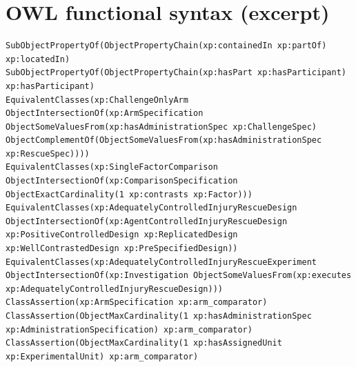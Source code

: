 \documentclass[10pt,a4paper]{article}
\begin{document}
\section{OWL functional syntax (excerpt)}\label{app:ofn}
\begin{Verbatim}[fontsize=\tiny,breaklines,frame=lines,framesep=2mm]
SubObjectPropertyOf(ObjectPropertyChain(xp:containedIn xp:partOf) xp:locatedIn)
SubObjectPropertyOf(ObjectPropertyChain(xp:hasPart xp:hasParticipant) xp:hasParticipant)
EquivalentClasses(xp:ChallengeOnlyArm ObjectIntersectionOf(xp:ArmSpecification ObjectSomeValuesFrom(xp:hasAdministrationSpec xp:ChallengeSpec) ObjectComplementOf(ObjectSomeValuesFrom(xp:hasAdministrationSpec xp:RescueSpec))))
EquivalentClasses(xp:SingleFactorComparison ObjectIntersectionOf(xp:ComparisonSpecification ObjectExactCardinality(1 xp:contrasts xp:Factor)))
EquivalentClasses(xp:AdequatelyControlledInjuryRescueDesign ObjectIntersectionOf(xp:AgentControlledInjuryRescueDesign xp:PositiveControlledDesign xp:ReplicatedDesign xp:WellContrastedDesign xp:PreSpecifiedDesign))
EquivalentClasses(xp:AdequatelyControlledInjuryRescueExperiment ObjectIntersectionOf(xp:Investigation ObjectSomeValuesFrom(xp:executes xp:AdequatelyControlledInjuryRescueDesign)))
ClassAssertion(xp:ArmSpecification xp:arm_comparator)
ClassAssertion(ObjectMaxCardinality(1 xp:hasAdministrationSpec xp:AdministrationSpecification) xp:arm_comparator)
ClassAssertion(ObjectMaxCardinality(1 xp:hasAssignedUnit xp:ExperimentalUnit) xp:arm_comparator)
\end{Verbatim}
\vspace{-4pt}\label{lst:ofn}\medskip
\end{document}
